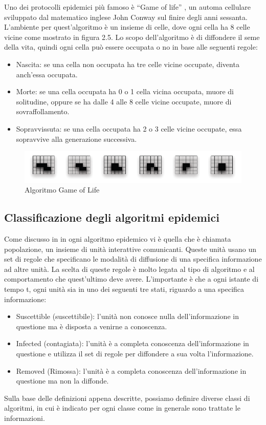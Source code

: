 Uno dei protocolli epidemici più famoso è “Game of life” \cite{gardner1970-gameoflife}, un automa cellulare sviluppato dal matematico inglese John Conway sul finire degli anni sessanta. L'ambiente per quest'algoritmo è un insieme di celle, dove ogni cella ha 8 celle vicine come mostrato in figura 2.5. Lo scopo dell'algoritmo è di diffondere il seme della vita, quindi ogni cella può essere occupata o no in base alle seguenti regole:
\begin{itemize}
	\item Nascita: se una cella non occupata ha tre celle vicine occupate, diventa anch’essa occupata.
	\item Morte: se una cella occupata ha 0 o 1 cella vicina occupata, muore di solitudine, oppure se ha dalle 4 alle 8 celle vicine occupate, muore di sovraffollamento.
	\item Sopravvissuta: se una cella occupata ha 2 o 3 celle vicine occupate, essa sopravvive alla generazione successiva.
\end{itemize}

\begin{figure}[bh]
\centering
\includegraphics[width=1\linewidth,keepaspectratio]{Images/algoritmi_gossip/game_of_life}
\caption[Game of Life]{Algoritmo Game of Life}
\label{fig:game_of_life}
\end{figure}

\subsection{Classificazione degli algoritmi epidemici}
Come discusso in \cite{schindel2004-epidemicAlg} in ogni algoritmo epidemico vi è quella che è chiamata popolazione, un insieme di unità interattive comunicanti. Queste unità usano un set di regole che specificano le modalità di diffusione di una specifica informazione ad altre unità. La scelta di queste regole è molto legata al tipo di algoritmo e al comportamento che quest'ultimo deve avere. L'importante è che a ogni istante di tempo t, ogni unità sia in uno dei seguenti tre stati, riguardo a una specifica informazione:
\begin{itemize}
		\item Suscettible (suscettibile): l’unità non conosce nulla dell’informazione in questione ma è disposta a venirne a conoscenza.
		\item Infected (contagiata): l’unità è a completa conoscenza dell’informazione in questione e utilizza il set di regole per diffondere a sua volta l’informazione.
		\item Removed (Rimossa): l’unità è a completa conoscenza dell’informazione in questione ma non la diffonde.
\end{itemize}
Sulla base delle definizioni appena descritte, possiamo definire diverse classi di algoritmi, in cui è indicato per ogni classe come in generale sono trattate le informazioni.

